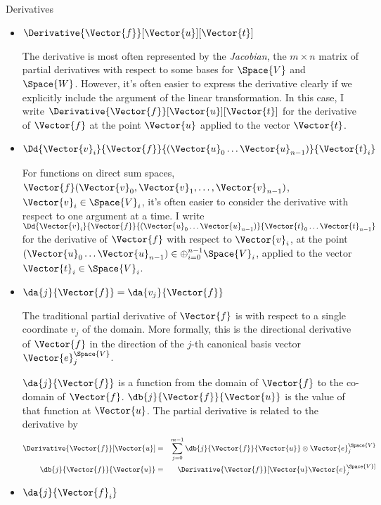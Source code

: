 \begin{plSection}{Derivatives}
\begin{itemize}
\item $\Derivative{\Vector{f}}[\Vector{u}][\Vector{t}]$

The derivative is most often represented by the \textit{Jacobian},
the $m \times n$ matrix of partial derivatives
with respect to some bases for $\Space{V}$ and $\Space{W}$.
However, it's often easier to express the derivative clearly if we
explicitly include the argument of the linear transformation.
In this case, I write $\Derivative{\Vector{f}}[\Vector{u}][\Vector{t}]$
for the derivative of $\Vector{f}$ at the point $\Vector{u}$
applied to the vector $\Vector{t}$.

\item $\Dd{\Vector{v}_i}{\Vector{f}}{(\Vector{u}_0 \ldots \Vector{u}_{n-1})}{\Vector{t}_i}$

For functions on direct sum spaces,
$\Vector{f}(\Vector{v}_0,\Vector{v}_1, \ldots, \Vector{v}_{n-1})$, $\Vector{v}_i \in \Space{V}_i$,
it's often easier to consider the derivative
with respect to one argument at a time.
I write $\Dd{\Vector{v}_i}{\Vector{f}}{(\Vector{u}_0 \ldots \Vector{u}_{n-1})}{\Vector{t}_0 \ldots \Vector{t}_{n-1}}$
for the derivative of $\Vector{f}$ with respect to $\Vector{v}_i$,
at the point $(\Vector{u}_0 \ldots \Vector{u}_{n-1}) \in \oplus_{i=0}^{n-1} \Space{V}_i$,
applied to the vector $\Vector{t}_i \in \Space{V}_i$.

\item $\da{j}{\Vector{f}} = \da{v_j}{\Vector{f}}$

The traditional partial derivative of $\Vector{f}$ is with respect to
a single coordinate $v_j$ of the domain.
More formally, this is the directional derivative of $\Vector{f}$
in the direction of the $j$-th canonical basis vector $\Vector{e}_j^{\Space{V}}$.

$\da{j}{\Vector{f}}$ is a function from the domain of $\Vector{f}$ to the co-domain of $\Vector{f}$.
$\db{j}{\Vector{f}}{\Vector{u}}$ is the value of that function at $\Vector{u}$.
The partial derivative is related to the derivative by
\begin{eqnarray}
\label{eq:partial-full-dervatives}
\Derivative{\Vector{f}}[\Vector{u}]
& = &
\sum_{j=0}^{m-1} \db{j}{\Vector{f}}{\Vector{u}} \otimes \Vector{e}_j^{\Space{V}}
\\
\db{j}{\Vector{f}}{\Vector{u}}
& = &
\Derivative{\Vector{f}}[\Vector{u}} \Vector{e}_j^{\Space{V}]
\nonumber
\end{eqnarray}

\item $\da{j}{\Vector{f}_i}$


\end{itemize}
\end{plSection}
